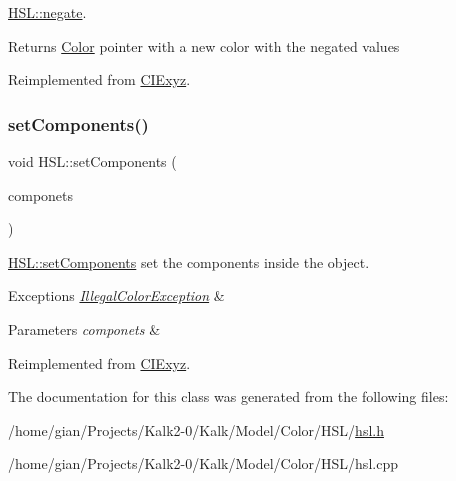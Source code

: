 \hyperlink{class_h_s_l_af681f885d11220b0588e8f969aa95e32}{H\+S\+L\+::negate}. 

\begin{DoxyReturn}{Returns}
\hyperlink{class_color}{Color} pointer with a new color with the negated values 
\end{DoxyReturn}


Reimplemented from \hyperlink{class_c_i_exyz_a4a454df6cbb71f3fcfd2d1ea9d500d94}{C\+I\+Exyz}.

\mbox{\label{class_h_s_l_a101be14729707abca388680610e2fe86}} 
\subsubsection{\texorpdfstring{set\+Components()}{setComponents()}}
{\footnotesize\ttfamily void H\+S\+L\+::set\+Components (\begin{DoxyParamCaption}\item[{Q\+Vector$<$ double $>$}]{componets }\end{DoxyParamCaption})\hspace{0.3cm}{\ttfamily [virtual]}}



\hyperlink{class_h_s_l_a101be14729707abca388680610e2fe86}{H\+S\+L\+::set\+Components} set the components inside the object. 


\begin{DoxyExceptions}{Exceptions}
{\em \hyperlink{class_illegal_color_exception}{Illegal\+Color\+Exception}} & \\
\hline
\end{DoxyExceptions}

\begin{DoxyParams}{Parameters}
{\em componets} & \\
\hline
\end{DoxyParams}


Reimplemented from \hyperlink{class_c_i_exyz_a11468574f91d2cb1356f0cde56429b84}{C\+I\+Exyz}.



The documentation for this class was generated from the following files\+:\begin{DoxyCompactItemize}
\item 
/home/gian/\+Projects/\+Kalk2-\/0/\+Kalk/\+Model/\+Color/\+H\+S\+L/\hyperlink{hsl_8h}{hsl.\+h}\item 
/home/gian/\+Projects/\+Kalk2-\/0/\+Kalk/\+Model/\+Color/\+H\+S\+L/hsl.\+cpp\end{DoxyCompactItemize}
